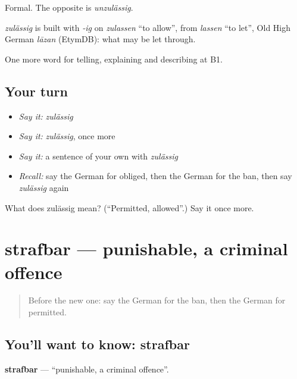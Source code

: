 Formal. The opposite is \emph{unzulässig}.

\begin{cousinweb}
\emph{zulässig} is built with \emph{-ig} on \emph{zulassen} \textquotedblleft{}to allow\textquotedblright{}, from \emph{lassen} \textquotedblleft{}to let\textquotedblright{}, Old High German \emph{lāzan} (EtymDB): what may be let through.
\end{cousinweb}

\begin{grammarlens}[title={What you've built}]
One more word for telling, explaining and describing at B1.
\end{grammarlens}

\subsection*{Your turn}
\begin{itemize}
\raggedright
  \item \emph{Say it:} \emph{zulässig}
  \item \emph{Say it:} \emph{zulässig}, once more
  \item \emph{Say it:} a sentence of your own with \emph{zulässig}
  \item \emph{Recall:} say the German for obliged, then the German for the ban, then say \emph{zulässig} again
\end{itemize}

\begin{tcolorbox}[breakable,colback=teal!4,colframe=teal!35!black,title={Before you move on}]
What does zulässig mean? (\textquotedblleft{}Permitted, allowed\textquotedblright{}.) Say it once more.
\end{tcolorbox}
\section[strafbar]{strafbar — punishable, a criminal offence}

\label{lesson:GE-C382-strafbar}



\begin{quote}
Before the new one: say the German for the ban, then the German for permitted.
\end{quote}

\subsection*{You'll want to know: strafbar}
\textbf{strafbar} — \textquotedblleft{}punishable, a criminal offence\textquotedblright{}.

